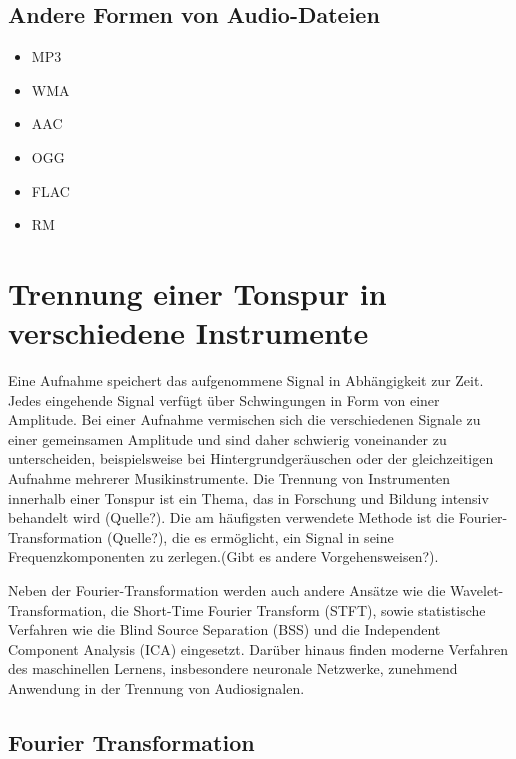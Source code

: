 %
\subsection{Andere Formen von Audio-Dateien}
\label{audio_representations}
%

%
\begin{itemize}
    \item MP3
    \item WMA
    \item AAC
    \item OGG
    \item FLAC
    \item RM
\end{itemize}
%

\parencite{audioformate_im_überblick}

%
\section{Trennung einer Tonspur in verschiedene Instrumente}
%

Eine Aufnahme speichert das aufgenommene Signal in Abhängigkeit zur Zeit. Jedes eingehende Signal verfügt über Schwingungen in Form von einer Amplitude. Bei einer Aufnahme vermischen sich die verschiedenen Signale zu einer gemeinsamen Amplitude und sind daher schwierig voneinander zu unterscheiden, beispielsweise bei Hintergrundgeräuschen oder der gleichzeitigen Aufnahme mehrerer Musikinstrumente. Die Trennung von Instrumenten innerhalb einer Tonspur ist ein Thema, das in Forschung und Bildung intensiv behandelt wird (Quelle?). Die am häufigsten verwendete Methode ist die Fourier-Transformation (Quelle?), die es ermöglicht, ein Signal in seine Frequenzkomponenten zu zerlegen.(Gibt es andere Vorgehensweisen?).

\par

Neben der Fourier-Transformation werden auch andere Ansätze wie die Wavelet-Transformation, die Short-Time Fourier Transform (STFT), sowie statistische Verfahren wie die Blind Source Separation (BSS) und die Independent Component Analysis (ICA) eingesetzt. Darüber hinaus finden moderne Verfahren des maschinellen Lernens, insbesondere neuronale Netzwerke, zunehmend Anwendung in der Trennung von Audiosignalen.

%
\subsection{Fourier Transformation}
%

